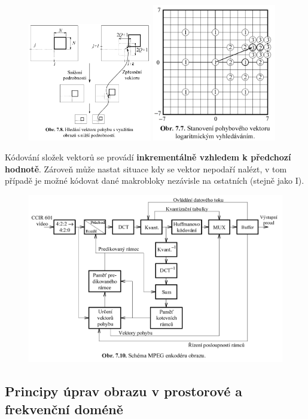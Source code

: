 \begin{figure}[H]
	\centering
	\includegraphics[width=0.48\textwidth]{assets/7_mpeg_rekurze}
	\includegraphics[width=0.48\textwidth]{assets/7_mpeg_log}
\end{figure}

Kódování složek vektorů se provádí \textbf{inkrementálně vzhledem k předchozí hodnotě}. Zároveň může nastat situace kdy se vektor nepodaří nalézt, v tom případě je možné kódovat dané makrobloky nezávisle na ostatních (stejně jako I).

\begin{figure}[H]
	\centering
	\includegraphics[width=\textwidth]{assets/7_mpeg_schema}
\end{figure}

\subsection{Principy úprav obrazu v prostorové a frekvenční doméně}




